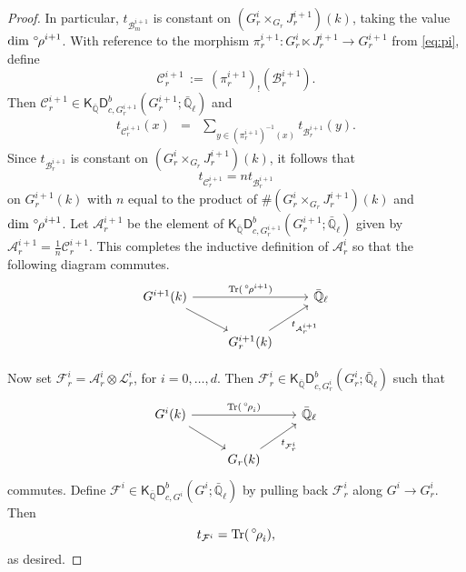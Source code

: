 \documentclass[10pt]{amsart}
\theoremstyle{plain}
\theoremstyle{definition}
\newcommand{\QQ}{{\mathbb{Q}}}
\newcommand{\EE}{\mathbb{\bar Q}_\ell}
\newcommand{\Fq}{k}
\DeclareMathOperator{\trace}{Tr}
\newcommand{\ceq}{{\, :=\, }}
\newcommand{\trFrob}[1]{t_{#1}}
\newcommand{\cs}[1]{{\mathcal{#1}}}
\newcommand{\orho}{{\,^\circ \hskip-1pt \rho}}
\begin{document}
\begin{proof}
In particular, $\trFrob{\cs{B}^{i+1}_m}$ is constant on $(G_r^{i}\times_{G_r} J_r^{i+1})(\Fq)$, taking the value $\dim \orho^{i+1}$.
With reference to the morphism $\pi_r^{i+1} : G_r^i \ltimes J_r^{i+1} \to G_r^{i+1}$ from \eqref{eq:pi}, define 
\[
\cs{C}_r^{i+1} \ceq (\pi_r^{i+1})_! (\cs{B}_r^{i+1}).
\]
Then $\cs{C}_r^{i+1}\in \mathsf{K}_{\bar\QQ}\mathsf{D}^b_{c,G_r^{i+1}}(G_r^{i+1};\EE)$ and
\begin{eqnarray*}
\trFrob{\cs{C}^{i+1}_r}(x)
&=& \sum_{y\in (\pi_r^{i+1})^{-1}(x)}  \trFrob{\cs{B}_r^{i+1}}(y).
\end{eqnarray*}
Since $\trFrob{\cs{B}^{i+1}_r}$ is constant on $(G_r^{i}\times_{G_r} J_r^{i+1})(\Fq)$, it follows that 
\[
\trFrob{\cs{C}^{i+1}_r} = n \trFrob{\cs{B}^{i+1}_r}
\]
on $G_r^{i+1}(\Fq)$ with $n$ equal to the product of $\# (G_r^{i}\times_{G_r} J_r^{i+1})(\Fq)$ and $\dim \orho^{i+1}$.
Let $\cs{A}_r^{i+1}$ be the element of $\mathsf{K}_{\bar\QQ}\mathsf{D}^b_{c,G_r^{i+1}}(G_r^{i+1};\EE)$ given by $\cs{A}_r^{i+1} = \frac{1}{n} \cs{C}_r^{i+1}$. 
%
This completes the inductive definition of $\cs{A}_r^i$ so that the following diagram commutes.
\[
\begin{tikzcd}
G^{i+1}(\Fq) \arrow{rr}{\trace(\orho^{i+1})} \arrow{rd} && \EE\\
& G_r^{i+1}(\Fq)\arrow{ru}[swap]{{\trFrob{\cs{A}_r^{i+1}}} } & 
\end{tikzcd}
\]

Now set $\cs{F}^i_r = \cs{A}_r^{i} \otimes \cs{L}_r^i$, for $i=0, \ldots ,d$.
Then $\cs{F}^i_r \in \mathsf{K}_{\bar\QQ}\mathsf{D}^b_{c,G_r^{i}}(G_r^{i};\EE)$ such that
\[
\begin{tikzcd}
G^i(\Fq) \arrow{rr}{\trace(\orho_i)} \arrow{rd} && \EE\\
& G_r(\Fq) \arrow{ru}[swap]{\trFrob{\cs{F}^i_r}} & 
\end{tikzcd}
\]
commutes.
Define $\cs{F}^i\in \mathsf{K}_{\bar\QQ}\mathsf{D}^b_{c,G^{i}}(G^{i};\EE)$ by pulling back $\cs{F}_r^i$ along $G^i \to G^i_r$.
Then 
\[
\trFrob{\cs{F}^i} = \trace(\orho_i),
\] 
as desired.
\end{proof}


\bigskip
\end{document}
